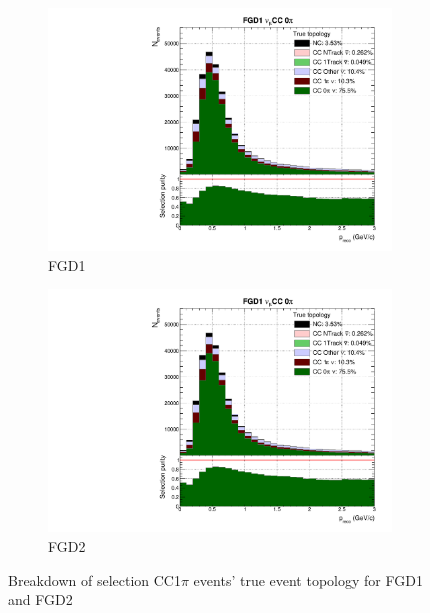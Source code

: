 \begin{figure}[!h]
	\begin{subfigure}[t]{0.49\textwidth}
		\includegraphics[width=\textwidth,page=3, trim={0mm 0mm 0mm 9mm}, clip]{figures/mach3/selection/2017b_Diag_WithSelection}
		\caption{FGD1}
	\end{subfigure}
	\begin{subfigure}[t]{0.49\textwidth}
		\includegraphics[width=\textwidth,page=9, trim={0mm 0mm 0mm 9mm}, clip]{figures/mach3/selection/2017b_Diag_WithSelection}
		\caption{FGD2}
	\end{subfigure}
	\caption{Breakdown of selection CC1$\pi$ events' true event topology for FGD1 and FGD2 }
	\label{fig:cc1pi_topology}
\end{figure}

